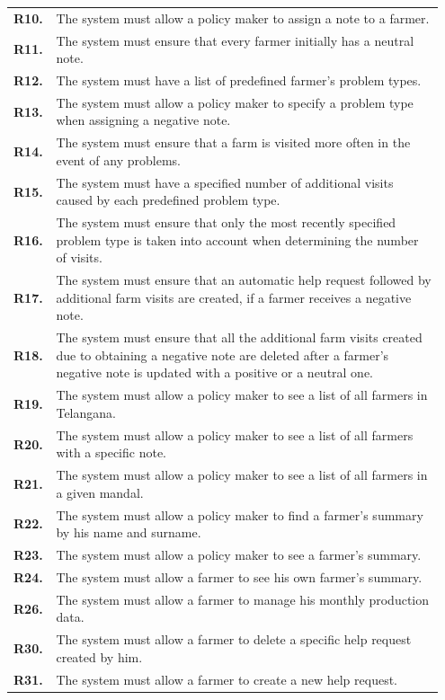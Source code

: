 \begin{longtable}{p{0.07\linewidth} p{0.88\linewidth}}
	\textbf{R10.} & The system must allow a policy maker to assign a note to a farmer.\\
	\textbf{R11.} & The system must ensure that every farmer initially has a neutral note.\\
	\textbf{R12.} & The system must have a list of predefined farmer's problem types.\\
    \textbf{R13.} & The system must allow a policy maker to specify a problem type when assigning a negative note.\\
    \textbf{R14.} & The system must ensure that a farm is visited more often in the event of any problems.\\
    \textbf{R15.} & The system must have a specified number of additional visits caused by each predefined problem type.\\
    \textbf{R16.} & The system must ensure that only the most recently specified problem type is taken into account when determining the number of visits.\\
	\textbf{R17.} & The system must ensure that an automatic help request followed by additional farm visits are created, if a farmer receives a negative note.\\
	\textbf{R18.} & The system must ensure that all the additional farm visits created due to obtaining a negative note are deleted after a farmer's negative note is updated with a positive or a neutral one.\\
	\textbf{R19.} & The system must allow a policy maker to see a list of all farmers in Telangana.\\
	\textbf{R20.} & The system must allow a policy maker to see a list of all farmers with a specific note.\\
	\textbf{R21.} & The system must allow a policy maker to see a list of all farmers in a given mandal.\\
	\textbf{R22.} & The system must allow a policy maker to find a farmer's summary by his name and surname.\\
	\textbf{R23.} & The system must allow a policy maker to see a farmer's summary.\\
	
	\textbf{R24.} & The system must allow a farmer to see his own farmer's summary.\\
	\textbf{R26.} & The system must allow a farmer to manage his monthly production data.\\
	\textbf{R30.} & The system must allow a farmer to delete a specific help request created by him.\\
	\textbf{R31.} & The system must allow a farmer to create a new help request.\\
	

\end{longtable}
